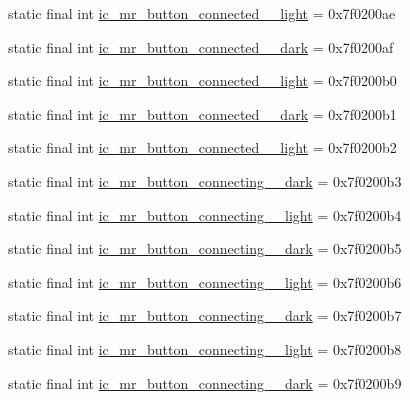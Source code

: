 \begin{CompactItemize}
\item 
static final int \hyperlink{classandroid_1_1support_1_1v7_1_1palette_1_1_r_1_1drawable_68b1a74b652cd81702c19943c4e0be27}{ic\_\-mr\_\-button\_\-connected\_\_\-light} = 0x7f0200ae
\item 
static final int \hyperlink{classandroid_1_1support_1_1v7_1_1palette_1_1_r_1_1drawable_de2fcf8ee0a84158521514f4ac11b8d5}{ic\_\-mr\_\-button\_\-connected\_\_\-dark} = 0x7f0200af
\item 
static final int \hyperlink{classandroid_1_1support_1_1v7_1_1palette_1_1_r_1_1drawable_5e5a393a5bbe3574db522cabf7318deb}{ic\_\-mr\_\-button\_\-connected\_\_\-light} = 0x7f0200b0
\item 
static final int \hyperlink{classandroid_1_1support_1_1v7_1_1palette_1_1_r_1_1drawable_c738a37a13eaab2668ceb91f0e853c5e}{ic\_\-mr\_\-button\_\-connected\_\_\-dark} = 0x7f0200b1
\item 
static final int \hyperlink{classandroid_1_1support_1_1v7_1_1palette_1_1_r_1_1drawable_a522a265c6f1ee20565e1076253e13e5}{ic\_\-mr\_\-button\_\-connected\_\_\-light} = 0x7f0200b2
\item 
static final int \hyperlink{classandroid_1_1support_1_1v7_1_1palette_1_1_r_1_1drawable_f95d3892b5f83caf708988c0ff521569}{ic\_\-mr\_\-button\_\-connecting\_\_\-dark} = 0x7f0200b3
\item 
static final int \hyperlink{classandroid_1_1support_1_1v7_1_1palette_1_1_r_1_1drawable_01f2c7e0cc0177893dee792f950c308a}{ic\_\-mr\_\-button\_\-connecting\_\_\-light} = 0x7f0200b4
\item 
static final int \hyperlink{classandroid_1_1support_1_1v7_1_1palette_1_1_r_1_1drawable_372e355227503c5e1473329097e6040b}{ic\_\-mr\_\-button\_\-connecting\_\_\-dark} = 0x7f0200b5
\item 
static final int \hyperlink{classandroid_1_1support_1_1v7_1_1palette_1_1_r_1_1drawable_71b891f8cc50a2d078dddf9975906449}{ic\_\-mr\_\-button\_\-connecting\_\_\-light} = 0x7f0200b6
\item 
static final int \hyperlink{classandroid_1_1support_1_1v7_1_1palette_1_1_r_1_1drawable_8ea535826fc7ce88fe38b209b90c2cf9}{ic\_\-mr\_\-button\_\-connecting\_\_\-dark} = 0x7f0200b7
\item 
static final int \hyperlink{classandroid_1_1support_1_1v7_1_1palette_1_1_r_1_1drawable_a2da16cde8368fb8ee1f31c3f4e1a843}{ic\_\-mr\_\-button\_\-connecting\_\_\-light} = 0x7f0200b8
\item 
static final int \hyperlink{classandroid_1_1support_1_1v7_1_1palette_1_1_r_1_1drawable_67a0c7de0d1109072849641d1e7cd0dd}{ic\_\-mr\_\-button\_\-connecting\_\_\-dark} = 0x7f0200b9

\end{CompactItemize}
